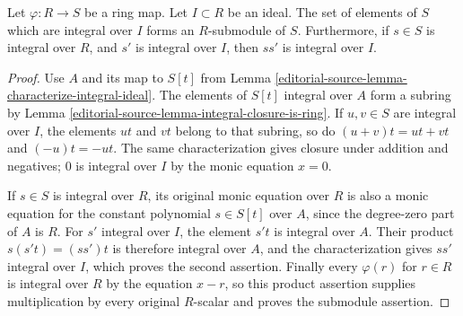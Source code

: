 \begin{lemma}
\label{editorial-source-lemma-integral-over-ideal-is-submodule}
Let $\varphi : R \to S$ be a ring map.
Let $I \subset R$ be an ideal.
The set of elements of $S$ which are integral
over $I$ forms an $R$-submodule of $S$.
Furthermore, if $s \in S$ is integral over
$R$, and $s'$ is integral over $I$, then
$ss'$ is integral over $I$.
\end{lemma}

\begin{proof}
Use $A$ and its map to $S[t]$ from
Lemma \ref{editorial-source-lemma-characterize-integral-ideal}. The elements of
$S[t]$ integral over $A$ form a subring by
Lemma \ref{editorial-source-lemma-integral-closure-is-ring}. If $u,v\in S$
are integral over $I$, the elements $ut$ and $vt$ belong to
that subring, so do $(u+v)t=ut+vt$ and $(-u)t=-ut$.
The same characterization gives closure under addition and negatives;
$0$ is integral over $I$ by the monic equation $x=0$.

If $s\in S$ is integral over $R$, its original monic equation
over $R$ is also a monic equation for the constant polynomial
$s\in S[t]$ over $A$, since the degree-zero part of $A$ is
$R$. For $s'$ integral over $I$, the element $s't$ is integral
over $A$. Their product $s(s't)=(ss')t$ is therefore integral
over $A$, and the characterization gives $ss'$ integral over
$I$, which proves the second assertion. Finally every
$\varphi(r)$ for $r\in R$ is integral over $R$ by the equation
$x-r$, so this product assertion supplies multiplication by
every original $R$-scalar and proves the submodule assertion.
\end{proof}